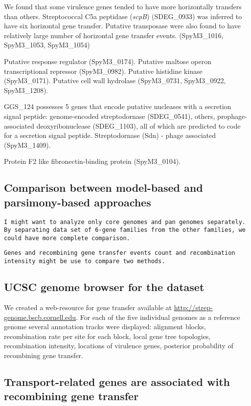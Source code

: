 \documentclass[english]{article}
\begin{document}
We found that some virulence genes tended to have more horizontally transfers
than others. 
Streptococcal C5a peptidase (\textit{scpB}) (SDEG\_0933) was inferred to have six
horizontal gene transfer. 
Putative transposase were also found to have relatively large number of
horizontal gene transfer events.
(SpyM3\_1016, SpyM3\_1053, SpyM3\_1054)

Putative response regulator (SpyM3\_0174).
Putative maltose operon transcriptional repressor (SpyM3\_0982).
Putative histidine kinase (SpyM3\_0171).
Putative cell wall hydrolase (SpyM3\_0731, SpyM3\_0922, SpyM3\_1208).

GGS\_124 possesses 5 genes that encode putative nucleases with a secretion
signal peptide: genome-encoded streptodornase (SDEG\_0541), others,
prophage-associated deoxyribonuclease (SDEG\_1103), all of which are predicted to code for a secretion signal peptide.
Streptodornase (Sdn) - phage associated  (SpyM3\_1409).

Protein F2 like fibronectin-binding protein (SpyM3\_0104).

\subsection{Comparison between model-based and parsimony-based approaches}

\texttt{I might want to analyze only core genomes and pan genomes
separately. By separating data set of 6-gene families from the other families,
we could have more complete comparison.}

\texttt{Genes and recombining gene transfer events count and recombination
intensity might be use to compare two methods.}

\subsection{UCSC genome browser for the dataset}
We created a web-resource for gene transfer available at
\url{http://strep-genome.bscb.cornell.edu}.  For each of the five individual
genomes as a reference genome several annotation tracks were displayed:
alignment blocks, recombination rate per site for each block, local gene tree
topologies, recombination intensity, locations of virulence genes, posterior
probability of recombining gene transfer.  

\subsection{Transport-related genes are associated with recombining gene transfer}
\end{document}
